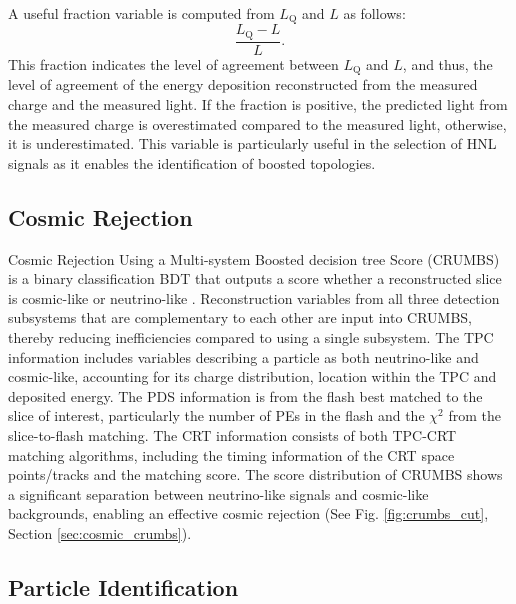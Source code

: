 A useful fraction variable is computed from $L_{\mathrm{Q}}$ and $L$ as follows:
\begin{equation}
\label{eq:opt0fraction}
        \frac{L_{\mathrm{Q}} - L}{L}.
\end{equation}
This fraction indicates the level of agreement between $L_{\mathrm{Q}}$ and $L$, and thus, the level of agreement of the energy deposition reconstructed from the measured charge and the measured light.
If the fraction is positive, the predicted light from the measured charge is overestimated compared to the measured light, otherwise, it is underestimated.
This variable is particularly useful in the selection of HNL signals as it enables the identification of boosted topologies.

\subsection{Cosmic Rejection}
\label{sec:crumbs}

Cosmic Rejection Using a Multi-system Boosted decision tree Score (CRUMBS) is a binary classification BDT that outputs a score whether a reconstructed slice is cosmic-like or neutrino-like \cite{crumbs}. 
Reconstruction variables from all three detection subsystems that are complementary to each other are input into CRUMBS, thereby reducing inefficiencies compared to using a single subsystem.
The TPC information includes variables describing a particle as both neutrino-like and cosmic-like, accounting for its charge distribution, location within the TPC and deposited energy.  
The PDS information is from the flash best matched to the slice of interest, particularly the number of PEs in the flash and the $\chi^{2}$ from the slice-to-flash matching.                        
The CRT information consists of both TPC-CRT matching algorithms, including the timing information of the CRT space points/tracks and the matching score.
The score distribution of CRUMBS shows a significant separation between neutrino-like signals and cosmic-like backgrounds, enabling an effective cosmic rejection (See Fig. \ref{fig:crumbs_cut}, Section \ref{sec:cosmic_crumbs}).


\subsection{Particle Identification}
\label{sec:razzled}

